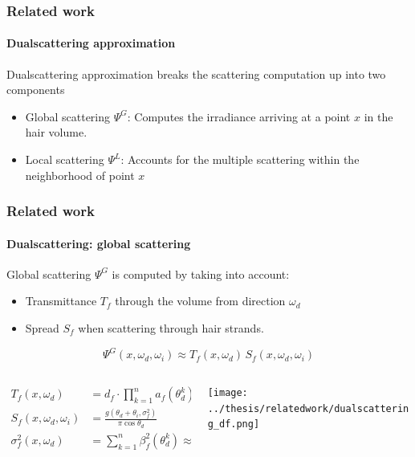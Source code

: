 \documentclass{beamer}
\begin{document}
  \begin{frame}
    \frametitle{Related work}
    \framesubtitle{Dualscattering approximation}
    Dualscattering approximation breaks the scattering computation up into two components
    \begin{itemize}
    \item Global scattering $\Psi^G$: Computes the irradiance arriving at a point $x$ in the hair volume.
        \item Local scattering $\Psi^L$: Accounts for the multiple scattering within the neighborhood of point $x$
    \end{itemize}
  \end{frame}
  
  
    \begin{frame}
    \frametitle{Related work}
    \framesubtitle{Dualscattering: global scattering}
    
    Global scattering $\Psi^G$ is computed by taking into account:
    
    \begin{itemize}
    \item Transmittance $T_f$ through the volume from direction $\omega_d$
    \item Spread $S_f$ when scattering through hair strands.
    \end{itemize}
    
    \begin{equation}
\Psi^G(x, \omega_d, \omega_i) \approx T_f(x, \omega_d)\,S_f(x, \omega_d, \omega_i)
\end{equation}

\begin{columns}
\begin{column}{0.4\textwidth}

\begin{align*}
T_f(x, \omega_d) &= d_f \cdot \prod_{k=1}^{n} a_f(\theta_d^k) \approx d_f \cdot a_f(\theta_d)^n \\
S_f(x, \omega_d, \omega_i) &= \frac{g(\theta_d + \theta_i, \sigma_f^2)}{\pi \cos \theta_d}  \\
\sigma_f^2(x, \omega_d) &= \sum_{k=1}^{n} \beta_f^2(\theta_d^k) \approx n \cdot \beta_f^2(\theta_d) \\
\end{align*}

\end{column}
\begin{column}{0.4\textwidth}
   \texttt{[image: ../thesis/relatedwork/dualscattering\_df.png]}
   \end{column}
   \end{columns}
  \end{frame}
  
\end{document}
